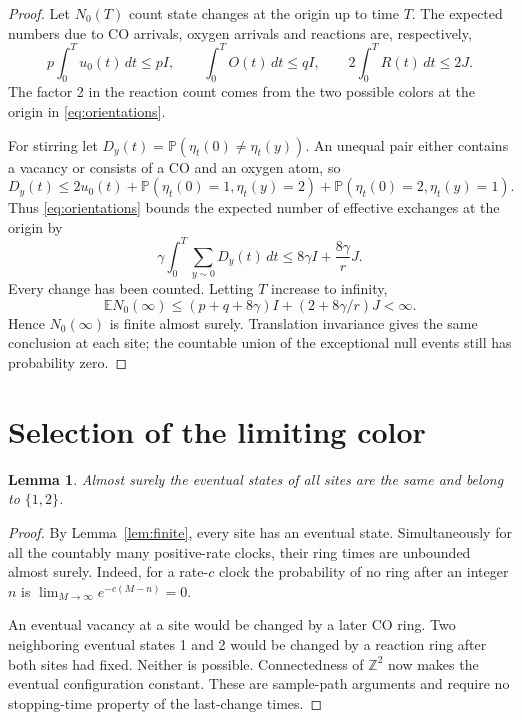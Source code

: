 \documentclass[11pt,a4paper]{article}
\newtheorem{lemma}[theorem]{Lemma}
\newcommand{\Prob}{\mathbb P}
\newcommand{\E}{\mathbb E}
\newcommand{\Z}{\mathbb Z}
\begin{document}
\begin{proof}
Let \(N_0(T)\) count state changes at the origin up to time \(T\).
The expected numbers due to CO arrivals, oxygen arrivals and reactions
are, respectively,
\[
 p\int_0^T u_0(t)\,dt\le pI,\qquad
 \int_0^T O(t)\,dt\le qI,\qquad
 2\int_0^T R(t)\,dt\le2J.
\]
The factor 2 in the reaction count comes from the two possible colors
at the origin in \eqref{eq:orientations}.

For stirring let
\(D_y(t)=\Prob(\eta_t(0)\ne\eta_t(y))\).
An unequal pair either contains a vacancy or consists of a CO and
an oxygen atom, so
\[
 D_y(t)\le2u_0(t)
       +\Prob(\eta_t(0)=1,\eta_t(y)=2)
       +\Prob(\eta_t(0)=2,\eta_t(y)=1).
\]
Thus \eqref{eq:orientations} bounds the expected number of effective
exchanges at the origin by
\[
 \gamma\int_0^T\sum_{y\sim0}D_y(t)\,dt
        \le8\gamma I+\frac{8\gamma}{r}J.
\]
Every change has been counted. Letting \(T\) increase to infinity,
\begin{equation}\label{eq:allchanges}
 \E N_0(\infty)
   \le(p+q+8\gamma)I+(2+8\gamma/r)J<\infty.
\end{equation}
Hence \(N_0(\infty)\) is finite almost surely. Translation invariance
gives the same conclusion at each site; the countable union of the
exceptional null events still has probability zero.
\end{proof}

\section{Selection of the limiting color}

\begin{lemma}\label{lem:color}
Almost surely the eventual states of all sites are the same and belong
to \(\{1,2\}\).
\end{lemma}

\begin{proof}
By Lemma~\ref{lem:finite}, every site has an eventual state.
Simultaneously for all the countably many positive-rate clocks, their
ring times are unbounded almost surely. Indeed, for a rate-\(c\) clock
the probability of no ring after an integer \(n\) is
\(\lim_{M\to\infty}e^{-c(M-n)}=0\).

An eventual vacancy at a site would be changed by a later CO ring.
Two neighboring eventual states 1 and 2 would be changed by a reaction
ring after both sites had fixed. Neither is possible. Connectedness of
\(\Z^2\) now makes the eventual configuration constant. These are
sample-path arguments and require no stopping-time property of the
last-change times.
\end{proof}
\end{document}
